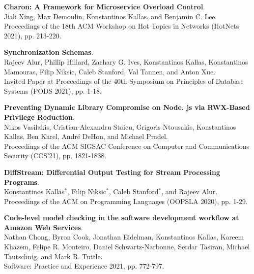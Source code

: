\begin{minipage}{\textwidth}
\textbf{Charon: A Framework for Microservice Overload Control}. \\
Jiali Xing, Max Demoulin, Konstantinos Kallas, and Benjamin C. Lee. \\
Proceedings of the 18th ACM Workshop on Hot Topics in Networks (HotNets 2021), pp. 213-220.
\end{minipage}

\begin{minipage}{\textwidth}
\textbf{Synchronization Schemas}. \\
Rajeev Alur, Phillip Hillard, Zachary G. Ives, Konstantinos Kallas, Konstantinos Mamouras, Filip Niksic, Caleb Stanford, Val Tannen, and Anton Xue. \\
Invited Paper at Proceedings of the 40th Symposium on Principles of Database Systems (PODS 2021), pp. 1-18.
\end{minipage}



\begin{minipage}{\textwidth}
\textbf{Preventing Dynamic Library Compromise on Node. js via RWX-Based Privilege Reduction}. \\
Nikos Vasilakis, Cristian-Alexandru Staicu, Grigoris Ntousakis, Konstantinos Kallas, Ben Karel, André DeHon, and Michael Pradel. \\
Proceedings of the ACM SIGSAC Conference on Computer and Communications Security (CCS'21), pp. 1821-1838.
\end{minipage}

\begin{minipage}{\textwidth}
\textbf{DiffStream: Differential Output Testing for Stream Processing Programs}. \\
Konstantinos Kallas$^*$, Filip Niksic$^*$, Caleb Stanford$^*$, and Rajeev Alur. \\
Proceedings of the ACM on Programming Languages (OOPSLA 2020), pp. 1-29.
\end{minipage}

\begin{minipage}{\textwidth}
\textbf{Code-level model checking in the software development workflow at Amazon Web Services}. \\
Nathan Chong, Byron Cook, Jonathan Eidelman, Konstantinos Kallas, Kareem Khazem, Felipe R. Monteiro, Daniel Schwartz-Narbonne, Serdar Tasiran, Michael Tautschnig, and Mark R. Tuttle. \\
Software: Practice and Experience 2021, pp. 772-797.
\end{minipage}

